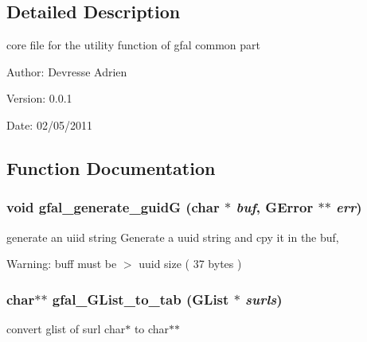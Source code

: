 \subsection{Detailed Description}
core file for the utility function of gfal common part 

\begin{Desc}
\item[Author:]Devresse Adrien \end{Desc}
\begin{Desc}
\item[Version:]0.0.1 \end{Desc}
\begin{Desc}
\item[Date:]02/05/2011 \end{Desc}


\subsection{Function Documentation}
\subsubsection{\setlength{\rightskip}{0pt plus 5cm}void gfal\_\-generate\_\-guid\-G (char $\ast$ {\em buf}, GError $\ast$$\ast$ {\em err})}\label{gfal__common__all_8c_4cb5e50a1af5612463aaa525162a2e9e}


generate an uiid string Generate a uuid string and cpy it in the buf, 

\begin{Desc}
\item[Warning:]buff must be $>$ uuid size ( 37 bytes ) \end{Desc}
\subsubsection{\setlength{\rightskip}{0pt plus 5cm}char$\ast$$\ast$ gfal\_\-GList\_\-to\_\-tab (GList $\ast$ {\em surls})}\label{gfal__common__all_8c_a7e1120eb32c4c7f293f6fbcb4f0ea33}


convert glist of surl char$\ast$ to char$\ast$$\ast$ 

